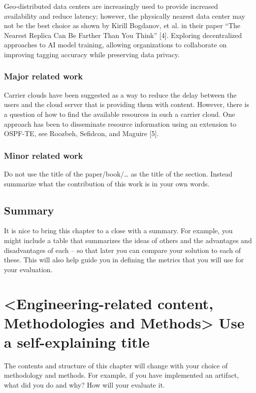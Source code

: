 \documentclass[a4paper,10pt,twocolumn]{article}
\numberwithin{figure}{section}
\numberwithin{table}{section}
\begin{document}
Geo-distributed data centers are increasingly used to provide increased availability and reduce
latency; however, the physically nearest data center may not be the best choice as shown by Kirill
Bogdanov, et al. in their paper “The Nearest Replica Can Be Farther Than You Think” [4].
Exploring decentralized approaches to AI model training, allowing organizations to collaborate on improving tagging accuracy while preserving data privacy.

\subsubsection{Major related work}
Carrier clouds have been suggested as a way to reduce the delay between the users and the cloud
server that is providing them with content. However, there is a question of how to find the available
resources in such a carrier cloud. One approach has been to disseminate resource information using
an extension to OSPF-TE, see Roozbeh, Sefidcon, and Maguire [5].

\subsubsection{Minor related work}
Do not use the title of the paper/book/… as the title of the section. Instead summarize what the contribution of this work is in your own words.

\subsection{Summary}
It is nice to bring this chapter to a close with a summary. For example, you might include a table that summarizes the ideas of others and the advantages and disadvantages of each – so that later you can compare your solution to each of these. This will also help guide you in defining the metrics that you will use for your evaluation.


\section{<Engineering-related content, Methodologies and Methods>
Use a self-explaining title}

The contents and structure of this chapter will change with your choice of methodology and methods.
For example, if you have implemented an artifact, what did you do and why? How will your evaluate it.
\end{document}
